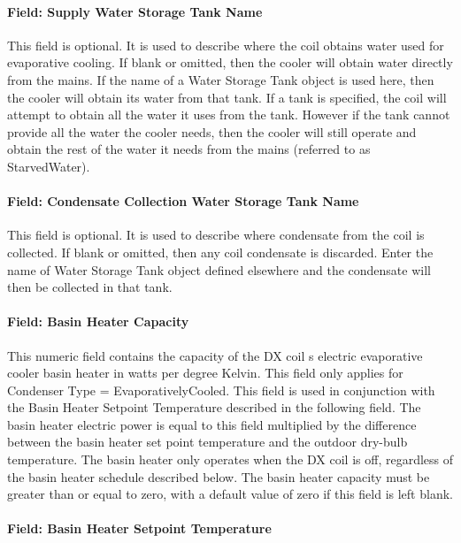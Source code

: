 \paragraph{Field: Supply Water Storage Tank Name}\label{field-supply-water-storage-tank-name-1-000}

This field is optional. It is used to describe where the coil obtains water used for evaporative cooling. If blank or omitted, then the cooler will obtain water directly from the mains. If the name of a Water Storage Tank object is used here, then the cooler will obtain its water from that tank. If a tank is specified, the coil will attempt to obtain all the water it uses from the tank. However if the tank cannot provide all the water the cooler needs, then the cooler will still operate and obtain the rest of the water it needs from the mains (referred to as StarvedWater).

\paragraph{Field: Condensate Collection Water Storage Tank Name}\label{field-condensate-collection-water-storage-tank-name-3}

This field is optional. It is used to describe where condensate from the coil is collected. If blank or omitted, then any coil condensate is discarded. Enter the name of Water Storage Tank object defined elsewhere and the condensate will then be collected in that tank.

\paragraph{Field: Basin Heater Capacity}\label{field-basin-heater-capacity-1-000}

This numeric field contains the capacity of the DX coil s electric evaporative cooler basin heater in watts per degree Kelvin. This field only applies for Condenser Type = EvaporativelyCooled. This field is used in conjunction with the Basin Heater Setpoint Temperature described in the following field. The basin heater electric power is equal to this field multiplied by the difference between the basin heater set point temperature and the outdoor dry-bulb temperature. The basin heater only operates when the DX coil is off, regardless of the basin heater schedule described below. The basin heater capacity must be greater than or equal to zero, with a default value of zero if this field is left blank.

\paragraph{Field: Basin Heater Setpoint Temperature}\label{field-basin-heater-setpoint-temperature-1-000}

